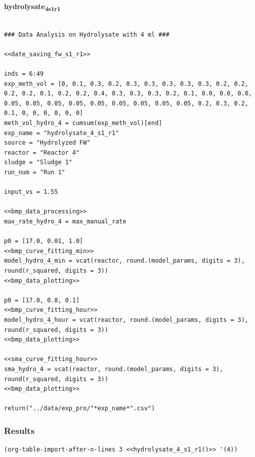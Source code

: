 \documentclass[11pt]{article}
\begin{document}
\textbf{hydrolysate\textsubscript{4}\textsubscript{s1}\textsubscript{r1}}
\begin{verbatim}

### Data Analysis on Hydrolysate with 4 ml ###

<<date_saving_fw_s1_r1>>

inds = 6:49
exp_meth_vol = [0, 0.1, 0.3, 0.2, 0.3, 0.3, 0.3, 0.3, 0.3, 0.2, 0.2, 0.2, 0.2, 0.1, 0.2, 0.2, 0.4, 0.3, 0.3, 0.3, 0.2, 0.1, 0.0, 0.0, 0.0, 0.05, 0.05, 0.05, 0.05, 0.05, 0.05, 0.05, 0.05, 0.05, 0.2, 0.3, 0.2, 0.1, 0, 0, 0, 0, 0, 0]
meth_vol_hydro_4 = cumsum(exp_meth_vol)[end]
exp_name = "hydrolysate_4_s1_r1"
source = "Hydrolyzed FW"
reactor = "Reactor 4"
sludge = "Sludge 1"
run_num = "Run 1"

input_vs = 1.55

<<bmp_data_processing>>
max_rate_hydro_4 = max_manual_rate

p0 = [17.0, 0.01, 1.0]
<<bmp_curve_fitting_min>>
model_hydro_4_min = vcat(reactor, round.(model_params, digits = 3), round(r_squared, digits = 3))
<<bmp_data_plotting>>

p0 = [17.0, 0.8, 0.1]
<<bmp_curve_fitting_hour>>
model_hydro_4_hour = vcat(reactor, round.(model_params, digits = 3), round(r_squared, digits = 3))
<<bmp_data_plotting>>

<<sma_curve_fitting_hour>>
sma_hydro_4 = vcat(reactor, round.(model_params, digits = 3), round(r_squared, digits = 3))
<<bmp_data_plotting>>

return("../data/exp_pro/"*exp_name*".csv")
\end{verbatim}

\subsubsection{Results}
\label{sec:org8ff36d4}

\begin{verbatim}
(org-table-import-after-n-lines 3 <<hydrolysate_4_s1_r1()>> '(4))
\end{verbatim}
\end{document}
